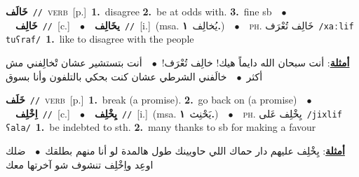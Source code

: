 \documentclass[10pt,a4paper,twoside]{article} %
\begin{document}
\begin{multicols}{2}
{\setlength\topsep{0pt}\textbf{\foreignlanguage{arabic}{خَالَف}}\ {\color{gray}\texttt{//}\color{black}}\ \textsc{verb}\ [p.]\ \textbf{1.}~disagree  \textbf{2.}~be at odds with.  \textbf{3.}~fine sb\ \ $\bullet$\ \ \setlength\topsep{0pt}\textbf{\foreignlanguage{arabic}{خَالِف}}\ {\color{gray}\texttt{//}\color{black}}\ [c.]\ \ $\bullet$\ \ \setlength\topsep{0pt}\textbf{\foreignlanguage{arabic}{يخَالِف}}\ {\color{gray}\texttt{//}\color{black}}\ [i.]\ \color{gray}(msa. \foreignlanguage{arabic}{يُخالِف}~\foreignlanguage{arabic}{\textbf{١.}})\color{black}\ \ $\bullet$\ \ \textsc{ph.} \color{gray} \foreignlanguage{arabic}{خَالِف تُعْرَف}\color{black}\ {\color{gray}\texttt{/{\sffamily xaːlif tuʕraf}/}\color{black}}\ \textbf{1.}~like to disagree with the people\  \begin{flushright}\color{gray}\foreignlanguage{arabic}{\textbf{\underline{\foreignlanguage{arabic}{أمثلة}}}: أنت سبحان الله دايماً هيك! خالِف تُعْرَف!\ $\bullet$\ \  أنت بتستشير عشان تْخالِفني مش أكثر\ $\bullet$\ \  خالَفني الشرطي عشان كنت بحكي بالتلفون وأنا بسوق}\end{flushright}\color{black}} \vspace{2mm}

{\setlength\topsep{0pt}\textbf{\foreignlanguage{arabic}{خَلَف}}\ {\color{gray}\texttt{//}\color{black}}\ \textsc{verb}\ [p.]\ \textbf{1.}~break (a promise).  \textbf{2.}~go back on (a promise)\ \ $\bullet$\ \ \setlength\topsep{0pt}\textbf{\foreignlanguage{arabic}{اِخْلِف}}\ {\color{gray}\texttt{//}\color{black}}\ [c.]\ \ $\bullet$\ \ \setlength\topsep{0pt}\textbf{\foreignlanguage{arabic}{يِخْلِف}}\ {\color{gray}\texttt{//}\color{black}}\ [i.]\ \color{gray}(msa. \foreignlanguage{arabic}{يَحْنِث}~\foreignlanguage{arabic}{\textbf{١.}})\color{black}\ \ $\bullet$\ \ \textsc{ph.} \color{gray} \foreignlanguage{arabic}{يِخْلِف عَلى}\color{black}\ {\color{gray}\texttt{/{\sffamily jixlif ʕala}/}\color{black}}\ \textbf{1.}~be indebted to sth.  \textbf{2.}~many thanks to sb for making a favour\  \begin{flushright}\color{gray}\foreignlanguage{arabic}{\textbf{\underline{\foreignlanguage{arabic}{أمثلة}}}: يِخْلِف عليهم دار حماك اللي حاويينك طول هالمدة لو أنا منهم بطلقك\ $\bullet$\ \  ضلك اوعِد واِخْلِف تنشوف شو آخرتها معك}\end{flushright}\color{black}} \vspace{2mm}


\end{multicols}
\end{document}
